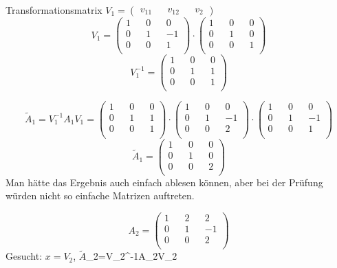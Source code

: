 \documentclass[a4paper]{article}
\begin{document}
\begin{itemize}
        Transformationsmatrix $V_{1}=\begin{pmatrix} v_{11}&& v_{12}&& v_{2}\end{pmatrix}$
       \[ V_{1}=\begin{pmatrix}
       1 && 0 && 0\\
       0 && 1 && -1\\
       0 && 0 && 1\\
       \end{pmatrix} 
       \cdot 
       \begin{pmatrix}
       1 && 0 && 0\\
       0 && 1 && 0\\
       0 && 0 && 1\\
       \end{pmatrix} 
   \]
   \[ V_{1}^{-1}=\begin{pmatrix}
   1 && 0 && 0\\
   0 && 1 && 1\\
   0 && 0 && 1\\
   \end{pmatrix}  \]

   \[ \tilde{A}_{1}=V_{1}^{-1}A_{1}V_{1}=\begin{pmatrix}
   1 && 0 && 0\\
   0 && 1 && 1\\
   0 && 0 && 1\\
   \end{pmatrix} 
\cdot 
\begin{pmatrix}
1 && 0 && 0\\
0 && 1 && -1\\
0 && 0 && 2\\
\end{pmatrix} 
\cdot 
\begin{pmatrix}
1 && 0 && 0\\
0 && 1 && -1\\
0 && 0 && 1\\
\end{pmatrix} \]
\[ \tilde{A}_{1}=\begin{pmatrix}
1 && 0 && 0\\
0 && 1 && 0\\
0 && 0 && 2\\
\end{pmatrix}  \]
Man hätte das Ergebnis auch einfach ablesen können, aber bei der Prüfung würden nicht so einfache Matrizen auftreten.

\end{itemize}
\[ A_{2}=\begin{pmatrix}
1 && 2 && 2\\
0 && 1 && -1\\
0 && 0 && 2\\
\end{pmatrix}  \]
Gesucht: $x=V_{2}$, $\tilde{A}$_{2}=V_{2}^{-1}A_{2}V_{2}
\end{document}
